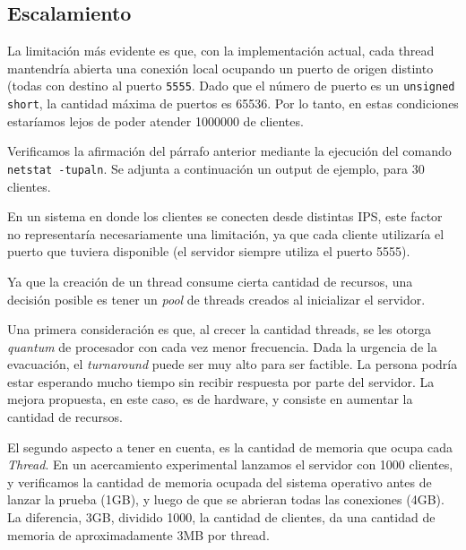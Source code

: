 \documentclass[11pt, a4paper, twoside]{article}
\begin{document}
\subsection{Escalamiento}

La limitación más evidente es que, con la implementación actual, cada thread mantendría abierta una conexión local ocupando un puerto de origen distinto (todas con destino al puerto \texttt{5555}. Dado que el número de puerto es un \texttt{unsigned short}, la cantidad máxima de puertos es 65536. Por lo tanto, en estas condiciones estaríamos lejos de poder atender 1000000 de clientes.

Verificamos la afirmación del párrafo anterior mediante la ejecución del comando \texttt{netstat -tupaln}. Se adjunta a continuación un output de ejemplo, para 30 clientes.



En un sistema en donde los clientes se conecten desde distintas IPS, este factor no representaría necesariamente una limitación, ya que cada cliente utilizaría el puerto que tuviera disponible (el servidor siempre utiliza el puerto 5555).

Ya que la creación de un thread consume cierta cantidad de recursos, una decisión posible es tener un \textit{pool} de threads creados al inicializar el servidor.

Una primera consideración es que, al crecer la cantidad threads, se les otorga \emph{quantum} de procesador con cada vez menor frecuencia. Dada la urgencia de la evacuación, el \emph{turnaround} puede ser muy alto para ser factible. La persona podría estar esperando mucho tiempo sin recibir respuesta por parte del servidor. La mejora propuesta, en este caso, es de hardware, y consiste en aumentar la cantidad de recursos.

El segundo aspecto a tener en cuenta, es la cantidad de memoria que ocupa cada \emph{Thread}. En un acercamiento experimental lanzamos el servidor con 1000 clientes, y verificamos la cantidad de memoria ocupada del sistema operativo antes de lanzar la prueba (1GB), y luego de que se abrieran todas las conexiones (4GB). La diferencia, 3GB, dividido 1000, la cantidad de clientes, da una cantidad de memoria de aproximadamente 3MB por thread.
\end{document}
